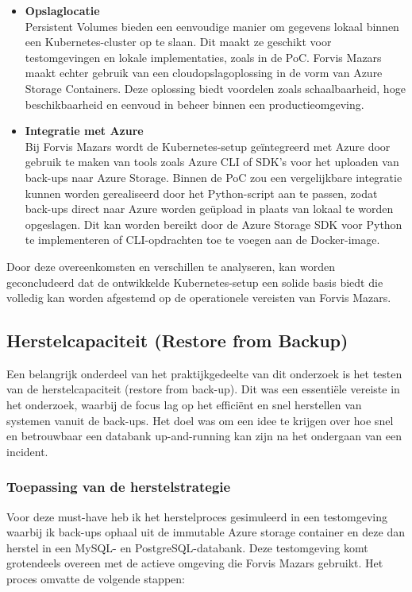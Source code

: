 \begin{itemize}
    \item \textbf{Opslaglocatie} \\
    Persistent Volumes bieden een eenvoudige manier om gegevens lokaal binnen een Kubernetes-cluster op te slaan. Dit maakt ze geschikt voor testomgevingen en lokale implementaties, zoals in de PoC. Forvis Mazars maakt echter gebruik van een cloudopslagoplossing in de vorm van Azure Storage Containers. Deze oplossing biedt voordelen zoals schaalbaarheid, hoge beschikbaarheid en eenvoud in beheer binnen een productieomgeving.
    
    \item \textbf{Integratie met Azure} \\
    Bij Forvis Mazars wordt de Kubernetes-setup geïntegreerd met Azure door gebruik te maken van tools zoals Azure CLI of SDK’s voor het uploaden van back-ups naar Azure Storage. Binnen de PoC zou een vergelijkbare integratie kunnen worden gerealiseerd door het Python-script aan te passen, zodat back-ups direct naar Azure worden geüpload in plaats van lokaal te worden opgeslagen. Dit kan worden bereikt door de Azure Storage SDK voor Python te implementeren of CLI-opdrachten toe te voegen aan de Docker-image.
\end{itemize}

Door deze overeenkomsten en verschillen te analyseren, kan worden geconcludeerd dat de ontwikkelde Kubernetes-setup een solide basis biedt die volledig kan worden afgestemd op de operationele vereisten van Forvis Mazars.



\subsection{Herstelcapaciteit (Restore from Backup)}
Een belangrijk onderdeel van het praktijkgedeelte van dit onderzoek is het testen van de herstelcapaciteit (restore from back-up). Dit was een essentiële vereiste in het onderzoek, waarbij de focus lag op het efficiënt en snel herstellen van systemen vanuit de back-ups. Het doel was om een idee te krijgen over hoe snel en betrouwbaar een databank up-and-running kan zijn na het ondergaan van een incident.

\subsubsection{Toepassing van de herstelstrategie}
Voor deze must-have heb ik het herstelproces gesimuleerd in een testomgeving waarbij ik back-ups ophaal uit de immutable Azure storage container en deze dan herstel in een MySQL- en PostgreSQL-databank. Deze testomgeving komt grotendeels overeen met de actieve omgeving die Forvis Mazars gebruikt. Het proces omvatte de volgende stappen:

